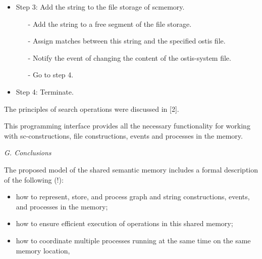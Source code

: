 \documentclass{article}
\begin{document}
\begin{multicols}{2}
\begin{itemize}
\end{itemize}

\begin{itemize}
\itemsep = 0mm
\item Step 3: Add the string to the file storage of scmemory.

\begin{itemize}
\itemsep=0mm
\item[-] Add the string to a free segment of the file
storage.

\item[-]Assign matches between this string and the specified ostis file.

\item[-]Notify the event of changing the content of the
ostis-system file.

\item[-] Go to step 4.

\end{itemize}
\end{itemize}

\begin{itemize}
\itemsep = 0mm
\item  Step 4: Terminate.


\end{itemize}

The principles of search operations were discussed in
[2].

{This programming interface provides all the necessary
functionality for working with sc-constructions, file constructions, events and processes in the memory.}

\textit{G. Conclusions}

{The proposed model of the shared semantic memory
includes a formal description of the following (!):}

\begin{itemize}
\itemsep = 0mm
\item  how to represent, store, and process graph and string
constructions, events, and processes in the memory;
\end{itemize}

\begin{itemize}
\itemsep = 0mm
\item how to ensure efficient execution of operations in
this shared memory;
\end{itemize}

\begin{itemize}
\itemsep = 0mm
\item how to coordinate multiple processes running at the
same time on the same memory location,
\end{itemize}


\end{multicols}
\end{document}
